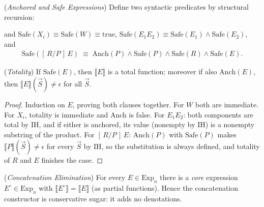 \documentclass[runningheads,envcountsect]{llncs}
\begin{document}
\begin{definition}
    (\emph{Anchored and Safe Expressions})
    \label{def:safe}
    Define two syntactic predicates by structural recursion:
    and $\mathrm{Safe}(X_i) \equiv \mathrm{Safe}(W) \equiv \mathrm{true}$, $\mathrm{Safe}(E_1E_2) \equiv \mathrm{Safe}(E_1) \wedge \mathrm{Safe}(E_2)$, and
    \begin{align}
        \mathrm{Safe}([\,R/P\,]\,E) \;\equiv\; \mathrm{Anch}(P) \wedge \mathrm{Safe}(P) \wedge \mathrm{Safe}(R) \wedge \mathrm{Safe}(E).
    \end{align}
\end{definition}

\begin{theorem}
    (\emph{Totality})
    \label{thm:totality}
    If $\mathrm{Safe}(E)$, then $\llbracket E \rrbracket$ is a total function; moreover if also $\mathrm{Anch}(E)$, then $\llbracket E \rrbracket(\vec S) \neq \epsilon$ for all $\vec S$.
\end{theorem}

\begin{proof}
    Induction on $E$, proving both clauses together. For $W$ both are immediate. For $X_i$, totality is immediate and Anch is false. For $E_1E_2$: both components are total by IH, and if either is anchored, its value (nonempty by IH) is a nonempty substring of the product. For $[\,R/P\,]\,E$: $\mathrm{Anch}(P)$ with $\mathrm{Safe}(P)$ makes $\llbracket P \rrbracket(\vec S) \neq \epsilon$ for every $\vec S$ by IH, so the substitution is always defined, and totality of $R$ and $E$ finishes the case.
\end{proof}

\begin{theorem}
    (\emph{Concatenation Elimination})
    \label{thm:core}
    For every $E \in \mathrm{Exp}_n$ there is a \emph{core} expression $E^\circ \in \mathrm{Exp}_n$ with $\llbracket E^\circ \rrbracket = \llbracket E \rrbracket$ (as partial functions). Hence the concatenation constructor is conservative sugar: it adds no denotations.
\end{theorem}
\end{document}
